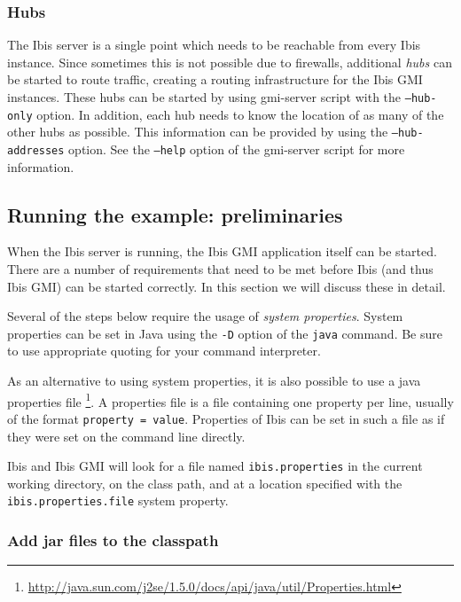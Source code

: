 \documentclass[a4paper,10pt]{article}
\begin{document}
\subsubsection{Hubs}
\label{hubs}

The Ibis server is a single point which needs to be reachable from every
Ibis instance. Since sometimes this is not possible due to firewalls,
additional \emph{hubs} can be started to route traffic, creating a
routing infrastructure for the Ibis GMI instances. These hubs can be started
by using gmi-server script with the \texttt{--hub-only} option. In
addition, each hub needs to know the location of as many of the other
hubs as possible. This information can be provided by using the
\texttt{--hub-addresses} option. See the \texttt{--help} option of the
gmi-server script for more information.

\subsection{Running the example: preliminaries}

When the Ibis server is running, the Ibis GMI application itself can be
started.  There are a number of requirements that need to be met before
Ibis (and thus Ibis GMI) can be started correctly.
In this section we will discuss these in detail.

Several of the steps below require the usage of \emph{system properties}.
System properties can be set in Java using the \texttt{-D} option of the
\texttt{java} command. Be sure to use appropriate quoting for your
command interpreter.

As an alternative to using system properties, it is also possible to use
a java properties file
\footnote{\url{http://java.sun.com/j2se/1.5.0/docs/api/java/util/Properties.html}}.
A properties file is a file containing one property per line, usually of
the format \texttt{property = value}. Properties of Ibis can be set in
such a file as if they were set on the command line directly.

Ibis and Ibis GMI will look for a file named \texttt{ibis.properties} in the
current working directory, on the class path, and at a location specified
with the \texttt{ibis.properties.file} system property.

\subsubsection{Add jar files to the classpath}
\end{document}
